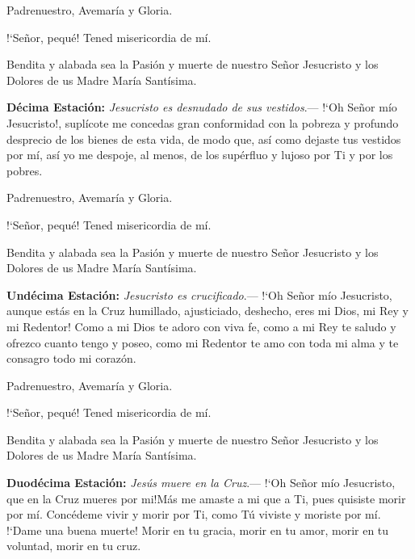 \vspace{2mm}

Padrenuestro, Avemaría y Gloria.

{!`}Señor, pequé! Tened misericordia de mí.

Bendita y alabada sea la Pasión y muerte de nuestro Señor Jesucristo y los Dolores de us Madre María Santísima.

\vspace{2mm}

\textbf{Décima Estación:} \textit{Jesucristo es desnudado de sus vestidos}.--- {!`}Oh Señor mío Jesucristo!, suplícote me concedas gran conformidad con la pobreza y profundo desprecio de los
bienes de esta vida, de modo que, así como dejaste tus vestidos por mí, así yo me despoje, al menos, de los supérfluo y lujoso por Ti y por los pobres.

\vspace{2mm}

Padrenuestro, Avemaría y Gloria.

{!`}Señor, pequé! Tened misericordia de mí.

Bendita y alabada sea la Pasión y muerte de nuestro Señor Jesucristo y los Dolores de us Madre María Santísima.

\vspace{2mm}

\textbf{Undécima Estación:} \textit{Jesucristo es crucificado}.--- {!`}Oh Señor mío Jesucristo, aunque estás en la Cruz humillado, ajusticiado, deshecho, eres mi Dios, mi Rey y mi Redentor!
Como a mi Dios te adoro con viva fe, como a mi Rey te saludo y ofrezco cuanto tengo y poseo, como mi Redentor te amo con toda mi alma y te consagro todo mi corazón. 

\vspace{2mm}

Padrenuestro, Avemaría y Gloria.

{!`}Señor, pequé! Tened misericordia de mí.

Bendita y alabada sea la Pasión y muerte de nuestro Señor Jesucristo y los Dolores de us Madre María Santísima.

\vspace{2mm}

\textbf{Duodécima Estación:} \textit{Jesús muere en la Cruz}.--- {!`}Oh Señor mío Jesucristo, que en la Cruz mueres por mi!Más me amaste a mi que a Ti, pues quisiste morir por mí.
Concédeme vivir y morir por Ti, como Tú viviste y moriste por mí. {!`}Dame una buena muerte! Morir en tu gracia, morir en tu amor, morir en tu voluntad, morir en tu cruz.

